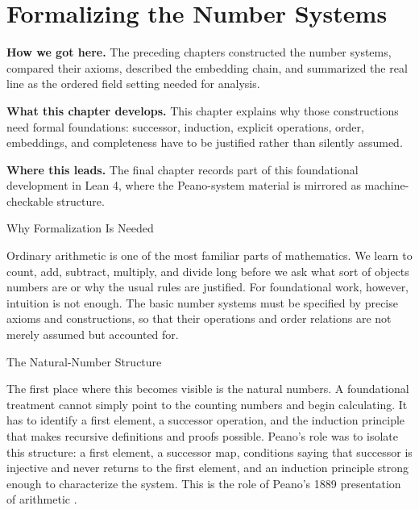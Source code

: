\chapter{Formalizing the Number Systems}
\label{chap:formalizing-number-systems}



\begin{tcolorbox}[
  colback=gray!6,
  colframe=gray!40,
  arc=2pt,
  left=8pt, right=8pt, top=6pt, bottom=6pt,
  title={\small\textbf{Structural Roadmap}},
  fonttitle=\small\bfseries
]
\noindent\textbf{How we got here.}
The preceding chapters constructed the number systems, compared their
axioms, described the embedding chain, and summarized the real line as the
ordered field setting needed for analysis.

\medskip
\noindent\textbf{What this chapter develops.}
This chapter explains why those constructions need formal foundations:
successor, induction, explicit operations, order, embeddings, and
completeness have to be justified rather than silently assumed.

\medskip
\noindent\textbf{Where this leads.}
The final chapter records part of this foundational development in Lean 4,
where the Peano-system material is mirrored as machine-checkable structure.
\end{tcolorbox}

\begin{topicbox}{Why Formalization Is Needed}
\begin{exposition}
Ordinary arithmetic is one of the most familiar parts of mathematics. We
learn to count, add, subtract, multiply, and divide long before we ask what
sort of objects numbers are or why the usual rules are justified. For
foundational work, however, intuition is not enough. The basic number systems
must be specified by precise axioms and constructions, so that their
operations and order relations are not merely assumed but accounted for.
\end{exposition}
\end{topicbox}

\begin{topicbox}{The Natural-Number Structure}
\begin{exposition}
The first place where this becomes visible is the natural numbers. A
foundational treatment cannot simply point to the counting numbers and begin
calculating. It has to identify a first element, a successor operation, and
the induction principle that makes recursive definitions and proofs possible.
Peano's role was to isolate this structure: a first element, a successor map,
conditions saying that successor is injective and never returns to the first
element, and an induction principle strong enough to characterize the system.
This is the role of Peano's 1889 presentation of arithmetic
\citep{PeanoArithmeticesPrincipia1889}.
\end{exposition}
\end{topicbox}

